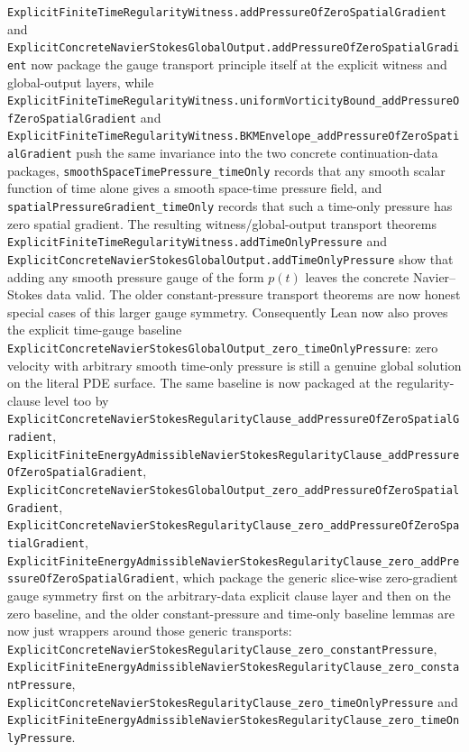 \documentclass[11pt]{article}
\begin{document}
\texttt{ExplicitFiniteTimeRegularityWitness.addPressureOfZeroSpatialGradient}
and
\texttt{ExplicitConcreteNavierStokesGlobalOutput.addPressureOfZeroSpatialGradient}
now package the gauge transport principle itself at the explicit witness and
global-output layers, while
\texttt{ExplicitFiniteTimeRegularityWitness.uniformVorticityBound\_addPressureOfZeroSpatialGradient}
and
\texttt{ExplicitFiniteTimeRegularityWitness.BKMEnvelope\_addPressureOfZeroSpatialGradient}
push the same invariance into the two concrete continuation-data packages,
\texttt{smoothSpaceTimePressure\_timeOnly} records that any smooth scalar
function of time alone gives a smooth space-time pressure field, and
\texttt{spatialPressureGradient\_timeOnly} records that such a time-only
pressure has zero spatial gradient.  The resulting witness/global-output
transport theorems
\texttt{ExplicitFiniteTimeRegularityWitness.addTimeOnlyPressure} and
\texttt{ExplicitConcreteNavierStokesGlobalOutput.addTimeOnlyPressure} show that
adding any smooth pressure gauge of the form \(p(t)\) leaves the concrete
Navier--Stokes data valid.  The older constant-pressure transport theorems are
now honest special cases of this larger gauge symmetry.  Consequently Lean now
also proves the explicit time-gauge baseline
\texttt{ExplicitConcreteNavierStokesGlobalOutput\_zero\_timeOnlyPressure}: zero
velocity with arbitrary smooth time-only pressure is still a genuine global
solution on the literal PDE surface.  The same baseline is now packaged at the
regularity-clause level too by
\texttt{ExplicitConcreteNavierStokesRegularityClause\_addPressureOfZeroSpatialGradient},
\texttt{ExplicitFiniteEnergyAdmissibleNavierStokesRegularityClause\_addPressureOfZeroSpatialGradient},
\texttt{ExplicitConcreteNavierStokesGlobalOutput\_zero\_addPressureOfZeroSpatialGradient},
\texttt{ExplicitConcreteNavierStokesRegularityClause\_zero\_addPressureOfZeroSpatialGradient},
\texttt{ExplicitFiniteEnergyAdmissibleNavierStokesRegularityClause\_zero\_addPressureOfZeroSpatialGradient},
which package the generic slice-wise zero-gradient gauge symmetry first on the
arbitrary-data explicit clause layer and then on the zero baseline, and the
older constant-pressure and time-only baseline lemmas are now just wrappers
around those generic transports:
\texttt{ExplicitConcreteNavierStokesRegularityClause\_zero\_constantPressure},
\texttt{ExplicitFiniteEnergyAdmissibleNavierStokesRegularityClause\_zero\_constantPressure},
\texttt{ExplicitConcreteNavierStokesRegularityClause\_zero\_timeOnlyPressure}
and
\texttt{ExplicitFiniteEnergyAdmissibleNavierStokesRegularityClause\_zero\_timeOnlyPressure}.
\end{document}
